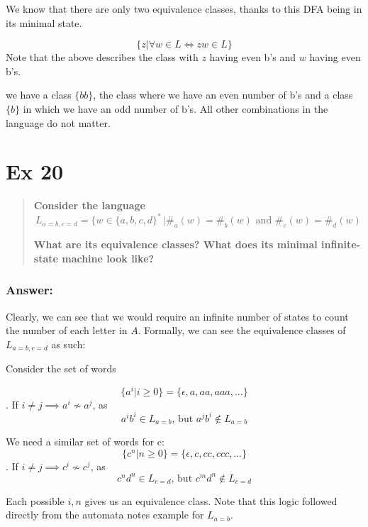 \documentclass[titlepage]{article}\usepackage[]{graphicx}\usepackage[]{color}
\begin{document}
  We know that there are only two equivalence classes, thanks to this DFA being
  in its minimal state. 

  \[ \{ z | \forall w \in L \Leftrightarrow zw \in L \} \]
  Note that the above describes the class with $z$ having even b's and $w$
  having even b's. 

  we have a class $\{bb\}$, the class where we have an even number of b's and a
  class $\{b\}$ in which we have an odd number of b's. All other combinations
  in the language do not matter.


\section*{Ex 20}
\begin{quote}
  \textbf{Consider the language}
  \[ L_{a=b,c=d } = \{ w \in \{a,b, c ,d \}^* \, | \#_a (w) = \#_b (w) \text{ and }
    \#_c (w) = \#_d (w )
  \]
  
\textbf{What are its equivalence classes? What does its minimal infinite-state machine
look like?}
\end{quote}

\subsubsection{Answer:}
Clearly, we can see that we would require an infinite number of states to
count the number of each letter in $A$. Formally, we can see the equivalence
classes of $L_{a=b,c=d}$ as such:

Consider the set of words

\[ \{ a^i | i \geq 0 \} = \{ \epsilon, a, aa, aaa, \dots\} \]. 
If $i \neq j \implies a^i \not \sim a^j$, as 
\[ a^ib^i \in L_{a=b} \text{, but } a^jb^i \notin L_{a=b} \]

We need a similar set of words for c:
\[ \{ c^n | n \geq 0 \} = \{ \epsilon, c, cc, ccc, \dots\} \]. 
If $i \neq j \implies c^i \not \sim c^j$, as 
\[ c^nd^n \in L_{c=d} \text{, but } c^md^n \notin L_{c=d} \]

Each possible $i,n$ gives us an equivalence class. Note that this logic
followed directly from the automata notes example for $L_{a=b}$.
\end{document}
